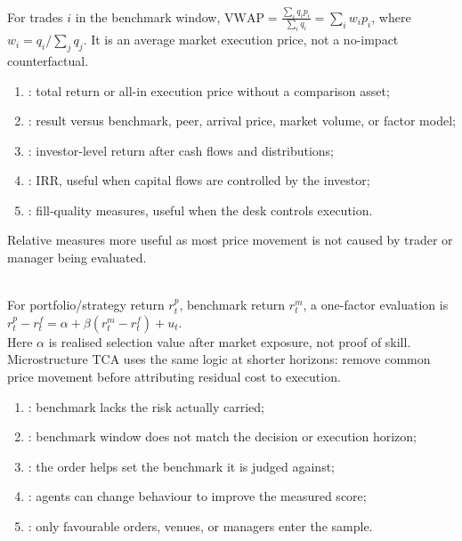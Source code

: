 \documentclass[a4paper,oneside,openany]{book}
\begin{document}
\begin{definition} \\
For trades $i$ in the benchmark window, $\mathrm{VWAP}=\frac{\sum_i q_i p_i}{\sum_i q_i}=\sum_i w_i p_i$, where $w_i=q_i/\sum_j q_j$. It is an average market execution price, not a no-impact counterfactual.
\end{definition}

\begin{taxonomy} 
\begin{enumerate}[label=\roman*.]
\setlength{\itemsep}{0pt}
\item {}: total return or all-in execution price without a comparison asset;
\item {}: result versus benchmark, peer, arrival price, market volume, or factor model;
\item {}: investor-level return after cash flows and distributions;
\item {}: IRR, useful when capital flows are controlled by the investor;
\item {}: fill-quality measures, useful when the desk controls execution.
\end{enumerate}
Relative measures more useful as most price movement is not caused by trader or manager being evaluated.
\end{taxonomy}

\begin{model} \\
For portfolio/strategy return $r^p_t$, benchmark return $r^m_t$, a one-factor evaluation is $r^p_t-r^f_t=\alpha+\beta(r^m_t-r^f_t)+u_t$.\\
Here $\alpha$ is realised selection value after market exposure, not proof of skill. Microstructure TCA uses the same logic at shorter horizons: remove common price movement before attributing residual cost to execution.
\end{model}

\begin{taxonomy} 
\begin{enumerate}[label=\roman*.]
\setlength{\itemsep}{0pt}
\item {}: benchmark lacks the risk actually carried;
\item {}: benchmark window does not match the decision or execution horizon;
\item {}: the order helps set the benchmark it is judged against;
\item {}: agents can change behaviour to improve the measured score;
\item {}: only favourable orders, venues, or managers enter the sample.
\end{enumerate}
\end{taxonomy}
\end{document}
